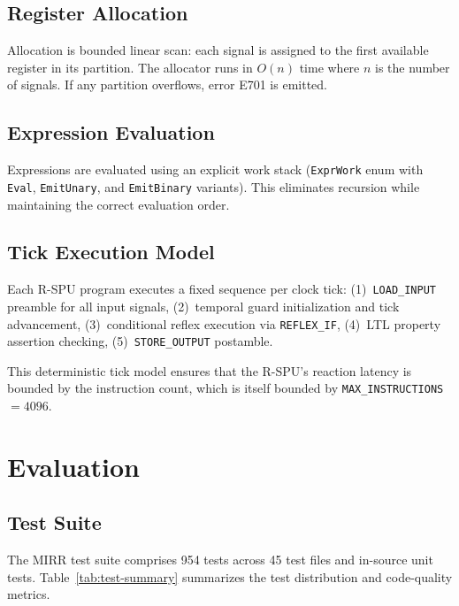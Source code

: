 \documentclass[conference]{IEEEtran}
\begin{document}
\subsection{Register Allocation}

Allocation is bounded linear scan: each signal is assigned to the first
available register in its partition.  The allocator runs in $O(n)$ time
where $n$ is the number of signals.  If any partition overflows,
error E701 is emitted.

\subsection{Expression Evaluation}

Expressions are evaluated using an explicit work stack
(\texttt{ExprWork} enum with \texttt{Eval}, \texttt{EmitUnary}, and
\texttt{EmitBinary} variants).  This eliminates recursion while
maintaining the correct evaluation order.

\subsection{Tick Execution Model}

Each R-SPU program executes a fixed sequence per clock tick:
(1)~\texttt{LOAD\_INPUT} preamble for all input signals,
(2)~temporal guard initialization and tick advancement,
(3)~conditional reflex execution via \texttt{REFLEX\_IF},
(4)~LTL property assertion checking,
(5)~\texttt{STORE\_OUTPUT} postamble.

This deterministic tick model ensures that the R-SPU's reaction latency
is bounded by the instruction count, which is itself bounded by
\texttt{MAX\_INSTRUCTIONS} $= 4096$.

\section{Evaluation}\label{sec:eval}

\subsection{Test Suite}

The MIRR test suite comprises 954 tests across 45 test files
and in-source unit tests.  Table~\ref{tab:test-summary} summarizes the test distribution and code-quality metrics.
\end{document}
